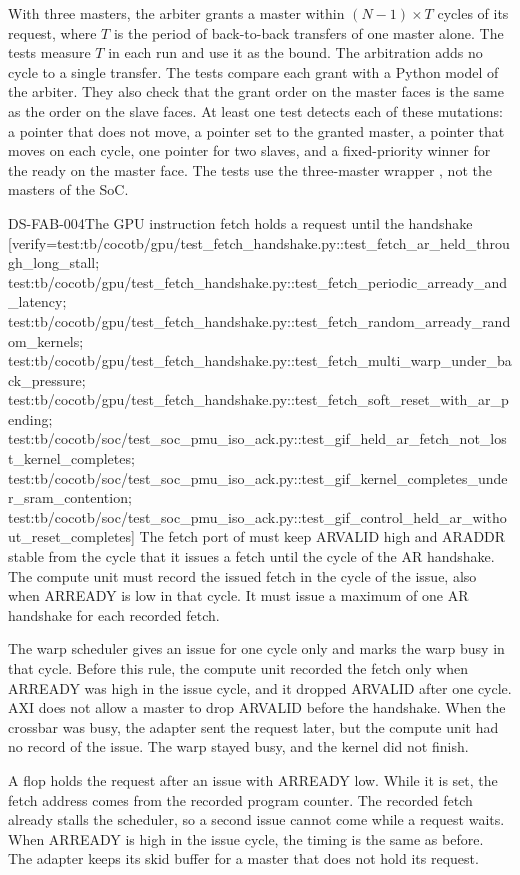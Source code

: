 \begin{information}
With three masters, the arbiter grants a master within $(N-1) \times T$ cycles of its request, where $T$ is the period of back-to-back transfers of one master alone. The tests measure $T$ in each run and use it as the bound. The arbitration adds no cycle to a single transfer. The tests compare each grant with a Python model of the arbiter. They also check that the grant order on the master faces is the same as the order on the slave faces. At least one test detects each of these mutations: a pointer that does not move, a pointer set to the granted master, a pointer that moves on each cycle, one pointer for two slaves, and a fixed-priority winner for the ready on the master face. The tests use the three-master wrapper , not the masters of the SoC.
\end{information}

\begin{requirement}{DS-FAB-004}{The GPU instruction fetch holds a request until the handshake}
[verify={test:tb/cocotb/gpu/test_fetch_handshake.py::test_fetch_ar_held_through_long_stall; test:tb/cocotb/gpu/test_fetch_handshake.py::test_fetch_periodic_arready_and_latency; test:tb/cocotb/gpu/test_fetch_handshake.py::test_fetch_random_arready_random_kernels; test:tb/cocotb/gpu/test_fetch_handshake.py::test_fetch_multi_warp_under_back_pressure; test:tb/cocotb/gpu/test_fetch_handshake.py::test_fetch_soft_reset_with_ar_pending; test:tb/cocotb/soc/test_soc_pmu_iso_ack.py::test_gif_held_ar_fetch_not_lost_kernel_completes; test:tb/cocotb/soc/test_soc_pmu_iso_ack.py::test_gif_kernel_completes_under_sram_contention; test:tb/cocotb/soc/test_soc_pmu_iso_ack.py::test_gif_control_held_ar_without_reset_completes}]
The fetch port of  must keep ARVALID high and ARADDR stable from the cycle that it issues a fetch until the cycle of the AR handshake. The compute unit must record the issued fetch in the cycle of the issue, also when ARREADY is low in that cycle. It must issue a maximum of one AR handshake for each recorded fetch.
\end{requirement}
\begin{rationale}
The warp scheduler gives an issue for one cycle only and marks the warp busy in that cycle. Before this rule, the compute unit recorded the fetch only when ARREADY was high in the issue cycle, and it dropped ARVALID after one cycle. AXI does not allow a master to drop ARVALID before the handshake. When the crossbar was busy, the adapter  sent the request later, but the compute unit had no record of the issue. The warp stayed busy, and the kernel did not finish.
\end{rationale}
\begin{information}
A flop  holds the request after an issue with ARREADY low. While it is set, the fetch address comes from the recorded program counter. The recorded fetch already stalls the scheduler, so a second issue cannot come while a request waits. When ARREADY is high in the issue cycle, the timing is the same as before. The adapter keeps its skid buffer for a master that does not hold its request.
\end{information}

